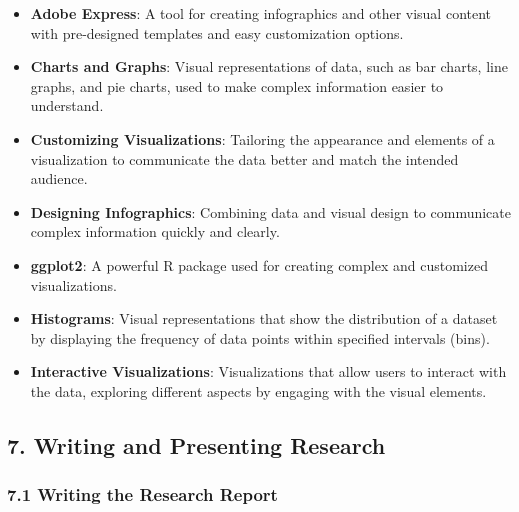 \documentclass[
]{book}
\providecommand{\tightlist}{%
  \setlength{\itemsep}{0pt}\setlength{\parskip}{0pt}}
\begin{document}
\begin{itemize}
\tightlist
\item
  \textbf{Adobe Express}: A tool for creating infographics and other visual content with pre-designed templates and easy customization options.
\item
  \textbf{Charts and Graphs}: Visual representations of data, such as bar charts, line graphs, and pie charts, used to make complex information easier to understand.
\item
  \textbf{Customizing Visualizations}: Tailoring the appearance and elements of a visualization to communicate the data better and match the intended audience.
\item
  \textbf{Designing Infographics}: Combining data and visual design to communicate complex information quickly and clearly.
\item
  \textbf{ggplot2}: A powerful R package used for creating complex and customized visualizations.
\item
  \textbf{Histograms}: Visual representations that show the distribution of a dataset by displaying the frequency of data points within specified intervals (bins).
\item
  \textbf{Interactive Visualizations}: Visualizations that allow users to interact with the data, exploring different aspects by engaging with the visual elements.
\end{itemize}

\subsection*{\texorpdfstring{7. \textbf{Writing and Presenting Research}}{7. Writing and Presenting Research}}\label{writing-and-presenting-research}

\subsubsection*{\texorpdfstring{\textbf{7.1 Writing the Research Report}}{7.1 Writing the Research Report}}\label{writing-the-research-report}
\end{document}
